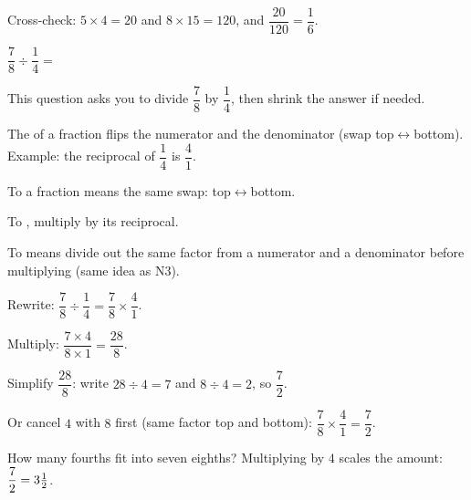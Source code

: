 
\noindent Cross-check: $5 \times 4 = 20$ and $8 \times 15 = 120$, and
$\dfrac{20}{120} = \dfrac{1}{6}$.


\noindent $\dfrac{7}{8} \div \dfrac{1}{4} = $\ansblank{}


\noindent This question asks you to divide $\dfrac{7}{8}$ by $\dfrac{1}{4}$,
then shrink the answer if needed.

\begin{words}
  \item The of a fraction flips the numerator and the
        denominator (swap top$\leftrightarrow$bottom). Example: the reciprocal
        of $\dfrac{1}{4}$ is $\dfrac{4}{1}$.
  \item To a fraction means the same swap: top$\leftrightarrow$bottom.
  \item To \unskip, multiply by its reciprocal.
  \item To means divide out the same factor from a numerator and a
        denominator before multiplying (same idea as N3).
\end{words}

\begin{steps}
  \item Rewrite: $\dfrac{7}{8} \div \dfrac{1}{4} = \dfrac{7}{8} \times
        \dfrac{4}{1}$.
  \item Multiply: $\dfrac{7 \times 4}{8 \times 1} = \dfrac{28}{8}$.
  \item Simplify $\dfrac{28}{8}$: write $28 \div 4 = 7$ and $8 \div 4 = 2$, so
        $\dfrac{7}{2}$.
  \item Or cancel $4$ with $8$ first (same factor top and bottom):
        $\dfrac{7}{8} \times \dfrac{4}{1} = \dfrac{7}{2}$.
\end{steps}


\noindent How many fourths fit into seven eighths? Multiplying by $4$ scales the
amount: $\dfrac{7}{2} = 3\tfrac{1}{2}$.

